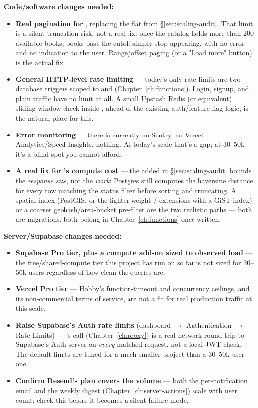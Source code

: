 \textbf{Code/software changes needed:}
\begin{itemize}
  \item \textbf{Real pagination for }, replacing the flat  from \S\ref{sec:scaling-audit}. That limit is a silent-truncation risk, not a real fix: once the catalog holds more than 200 available books, books past the cutoff simply stop appearing, with no error and no indication to the user. Range/offset paging (or a "Load more" button) is the actual fix.
  \item \textbf{General HTTP-level rate limiting} — today's only rate limits are two database triggers scoped to  and  (Chapter~\ref{ch:functions}). Login, signup, and plain  traffic have no limit at all. A small Upstash Redis (or equivalent) sliding-window check inside , ahead of the existing auth/feature-flag logic, is the natural place for this.
  \item \textbf{Error monitoring} — there is currently no Sentry, no Vercel Analytics/Speed Insights, nothing. At today's scale that's a gap; at 30--50k it's a blind spot you cannot afford.
  \item \textbf{A real fix for 's compute cost} — the  added in \S\ref{sec:scaling-audit} bounds the \emph{response size}, not the \emph{work}: Postgres still computes the haversine distance for every row matching the status filter before sorting and truncating. A spatial index (PostGIS, or the lighter-weight / extensions with a GiST index) or a coarser geohash/area-bucket pre-filter are the two realistic paths — both are migrations, both belong in Chapter~\ref{ch:functions} once written.
\end{itemize}

\textbf{Server/Supabase changes needed:}
\begin{itemize}
  \item \textbf{Supabase Pro tier, plus a compute add-on sized to observed load} — the free/shared-compute tier this project has run on so far is not sized for 30--50k users regardless of how clean the queries are.
  \item \textbf{Vercel Pro tier} — Hobby's function-timeout and concurrency ceilings, and its non-commercial terms of service, are not a fit for real production traffic at this scale.
  \item \textbf{Raise Supabase's Auth rate limits} (dashboard $\to$ Authentication $\to$ Rate Limits) — 's  call (Chapter~\ref{ch:proxy}) is a real network round-trip to Supabase's Auth server on \emph{every} matched request, not a local JWT check. The default limits are tuned for a much smaller project than a 30--50k-user one.
  \item \textbf{Confirm Resend's plan covers the volume} — both the per-notification email and the weekly digest (Chapter~\ref{ch:server-actions}) scale with user count; check this before it becomes a silent failure mode.
\end{itemize}

